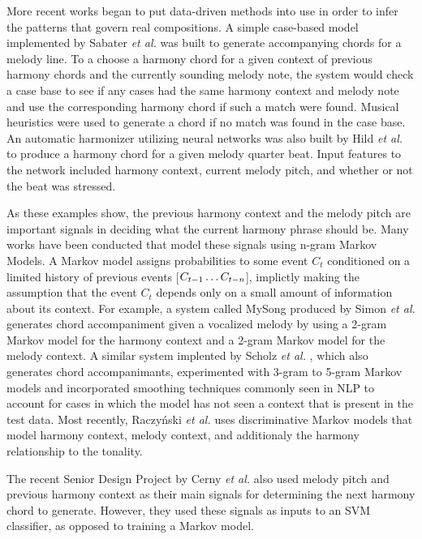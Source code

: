 \documentclass{sig-alternate}
\begin{document}
More recent works began to put data-driven methods into use in order to infer the patterns that govern real compositions. A simple case-based model implemented by Sabater \textit{et al.} \cite{Sabater98usingrules} was built to generate
accompanying chords for a melody line. To a choose a harmony chord for a given context of previous
harmony chords and the currently sounding melody note, the system would check a case base to see if any
cases had the same harmony context and melody note and use the corresponding harmony chord if such a 
match were found. Musical heuristics were used to generate a chord if no match was found in the case base.
An automatic harmonizer utilizing neural networks was also built by Hild \textit{et al.} \cite{NIPS1991_576}  to produce a harmony
chord for a given melody quarter beat. Input features to the network included harmony context, current melody pitch,
and whether or not the beat was stressed.

As these examples show, the previous harmony context and the melody pitch are important signals in deciding
what the current harmony phrase should be. Many works have been conducted that model these signals using
n-gram Markov Models. A Markov model assigns probabilities to some event $C_{t}$ conditioned on a limited history
of previous events [$C_{t-1}\ldots\\
C_{t-n}$], implictly making the assumption that the event $C_{t}$ depends only on a 
small amount of information about its context. For example, a system called MySong produced by Simon \textit{et al.} \cite{export:64277}
generates chord accompaniment given a vocalized melody by using a 2-gram Markov model for the harmony
context and a 2-gram Markov model for the melody context. A similar system implented by Scholz \textit{et al.} \cite{4959518},
which also generates chord accompanimants, experimented with 3-gram to 5-gram Markov models and incorporated
smoothing techniques commonly seen in NLP to account for cases in which the model has not seen a context
that is present in the test data. Most recently, Raczy\'{n}ski \textit{et al.} \cite{doi:10.1080/09298215.2013.822000} uses discriminative Markov models that
model harmony context, melody context, and additionaly the harmony relationship to the tonality.

The recent Senior Design Project by Cerny \textit{et al.} \cite{UAMP} also used melody pitch and previous harmony context
as their main signals for determining the next harmony chord to generate. However, they used these
signals as inputs to an SVM classifier, as opposed to training a Markov model. 
\end{document}
